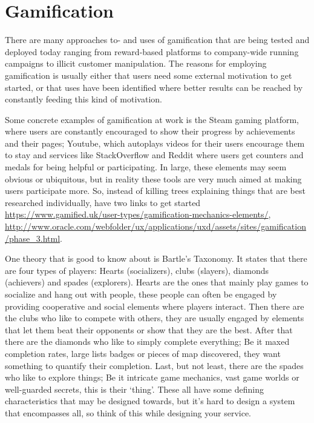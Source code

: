 \section*{Gamification}
\begin{refsection}
There are many approaches to- and uses of gamification that are being tested and deployed today ranging from reward-based platforms to company-wide running campaigns to illicit customer manipulation. The reasons for employing gamification is usually either that users need some external motivation to get started, or that uses have been identified where better results can be reached by constantly feeding this kind of motivation.

    Some concrete examples of gamification at work is the Steam gaming platform, where users are constantly encouraged to show their progress by achievements and their pages; Youtube, which autoplays videos for their users encourage them to stay and services like StackOverflow and Reddit where users get counters and medals for being helpful or participating. In large, these elements may seem obvious or ubiquitous, but in reality these tools are very much aimed at making users participate more. So, instead of killing trees explaining things that are best researched individually, have two links to get started \url{https://www.gamified.uk/user-types/gamification-mechanics-elements/}, \url{http://www.oracle.com/webfolder/ux/applications/uxd/assets/sites/gamification/phase_3.html}.

    One theory that is good to know about is Bartle's Taxonomy\supercite{bartle}. It states that there are four types of players: Hearts (socializers), clubs (slayers), diamonds (achievers) and spades (explorers). Hearts are the ones that mainly play games to socialize and hang out with people, these people can often be engaged by providing cooperative and social elements where players interact. Then there are the clubs who like to compete with others, they are usually engaged by elements that let them beat their opponents or show that they are the best. After that there are the diamonds who like to simply complete everything; Be it maxed completion rates, large lists badges or pieces of map discovered, they want something to quantify their completion. Last, but not least, there are the spades who like to explore things; Be it intricate game mechanics, vast game worlds or well-guarded secrets, this is their `thing'. These all have some defining characteristics that may be designed towards, but it's hard to design a system that encompasses all, so think of this while designing your service.

\printbibliography[heading=subbibliography]

\end{refsection}

